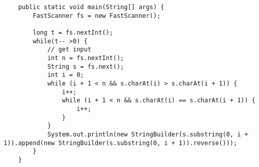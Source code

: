 \documentclass[12pt]{article}
\begin{document}
 \begin{verbatim} 
    public static void main(String[] args) {
        FastScanner fs = new FastScanner();

        long t = fs.nextInt();
        while(t-- >0) {
            // get input
            int n = fs.nextInt();
            String s = fs.next();
            int i = 0;
            while (i + 1 < n && s.charAt(i) > s.charAt(i + 1)) {
                i++;
                while (i + 1 < n && s.charAt(i) == s.charAt(i + 1)) {
                    i++;
                }
            }
            System.out.println(new StringBuilder(s.substring(0, i + 1)).append(new StringBuilder(s.substring(0, i + 1)).reverse()));
        }
    }
 \end{verbatim} 
 
\end{document}
